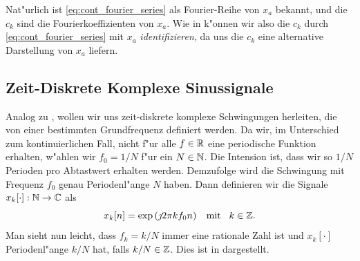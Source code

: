 Nat"urlich ist \eqref{eq:cont_fourier_series} als Fourier-Reihe von $x_a$ bekannt, und die $c_k$ sind die Fourierkoeffizienten von $x_a$.
Wie in  k"onnen wir also die $c_k$ durch \eqref{eq:cont_fourier_series} mit $x_a$ \emph{identifizieren}, da uns die $c_k$ eine alternative Darstellung von $x_a$ liefern.
%
\subsection{Zeit-Diskrete Komplexe Sinussignale}\label{sec:sampling:disc_sin}
%
Analog zu , wollen wir uns zeit-diskrete komplexe Schwingungen herleiten, die von einer bestimmten Grundfrequenz definiert werden.
Da wir, im Unterschied zum kontinuierlichen Fall, nicht f"ur alle $f \in \mathbb{R}$ eine periodische Funktion erhalten, w"ahlen wir $f_0 = 1/N$ f"ur ein $N \in \mathbb{N}$. 
Die Intension ist, dass wir so $1/N$ Perioden pro Abtastwert erhalten werden. 
Demzufolge wird die Schwingung mit Frequenz $f_0$ genau Periodenl"ange $N$ haben.
Dann definieren wir die Signale $x_k[\cdot]: \mathbb{N} \rightarrow \mathbb{C}$ als
%
\begin{equation}\label{eq:disc_harms_comp}
    x_k[n] = \exp\left(
        \jmath 2 \pi k f_0 n
    \right) {\hspace{3mm} \text{mit} \hspace{3mm}} k \in \mathbb{Z}.
\end{equation}
%
Man sieht nun leicht, dass $f_k = k/N$ immer eine rationale Zahl ist und $x_k[\cdot]$ Periodenl"ange $k/N$ hat, falls $k/N \in \mathbb{Z}$.
Dies ist in  dargestellt.

